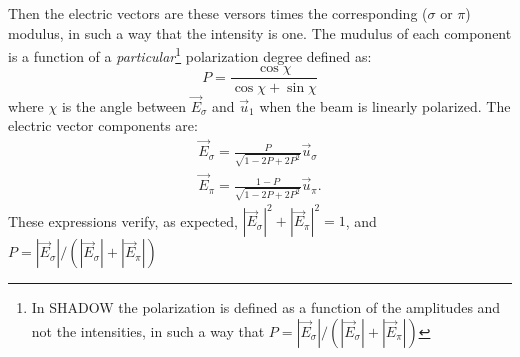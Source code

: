 \documentclass{iucr}
\begin{document}







Then the electric vectors are these versors times the corresponding ($\sigma$ or $\pi$) modulus, in such a way that  the intensity is one. The mudulus of each component is a function of a {\it particular}\footnote{In SHADOW the polarization is defined as a function of the amplitudes and not the intensities, in such a way that $P=|\vec{E}_\sigma|/(|\vec{E}_\sigma|+|\vec{E}_\pi|)$} polarization degree defined as:
\begin{equation}
   P = \frac{\cos \chi}{\cos \chi + \sin \chi}
\end{equation}
where $\chi$ is the angle between $\vec{E}_\sigma$ and $\vec{u}_1$ when the beam is linearly polarized. 
The electric vector components are: 
\begin{eqnarray}
   \vec{E}_\sigma = \frac{P}{\sqrt{1-2 P+ 2 P^2}} \vec{u}_\sigma \nonumber \\
   \vec{E}_\pi    = \frac{1-P}{\sqrt{1-2 P+ 2 P^2}} \vec{u}_\pi.
\end{eqnarray}
These expressions verify, as expected,  $|\vec{E}_\sigma|^2 + |\vec{E}_\pi|^2 = 1$, and $P=|\vec{E}_\sigma|/(|\vec{E}_\sigma|+|\vec{E}_\pi|)$
\end{document}
